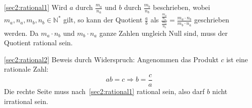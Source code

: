 \documentclass[10pt, a4paper]{amsart}
\makeatletter
\renewcommand\proofname{Beweis}
\renewenvironment{proof}[1][\proofname]{\par
\pushQED{\qed}%
\normalfont \topsep6\p@\@plus6\p@\relax
\trivlist
\item\relax
{\bfseries#1}\hspace\labelsep\ignorespaces
}{%
\popQED\endtrivlist\@endpefalse
}
\newenvironment{proof_thm}[1]{
\begin{proof}[\proofname~(#1)]}{\end{proof}}
\makeatother
\begin{document}
\begin{proof_thm}{\autoref{sec2:rational1}}
  Wird $a$ durch $\frac{m_a}{n_a}$ und $b$ durch $\frac{m_b}{n_b}$ beschrieben,
  wobei $m_a,n_a,m_b,n_b∈ℕ^*$ gilt, so kann der Quotient $\frac{a}{b}$ als
  $\frac{\frac{m_a}{n_a}}{\frac{m_b}{n_b}}=\frac{m_a\cdot n_b}{m_b\cdot n_a}$
  geschrieben werden. Da $m_a\cdot n_b$ und $m_b\cdot n_a$ ganze Zahlen ungleich
  Null sind, muss der Quotient rational sein.
\end{proof_thm}
\begin{proof_thm}{\autoref{sec2:rational2}}
  Beweis durch Widerspruch: Angenommen das Produkt $c$ ist eine rationale Zahl:
  \begin{equation*}
    ab=c \Rightarrow b =\frac{c}{a}
  \end{equation*}
  Die rechte Seite muss nach~\autoref{sec2:rational1} rational sein, also darf
  $b$ nicht irrational sein.
\end{proof_thm}
\end{document}
